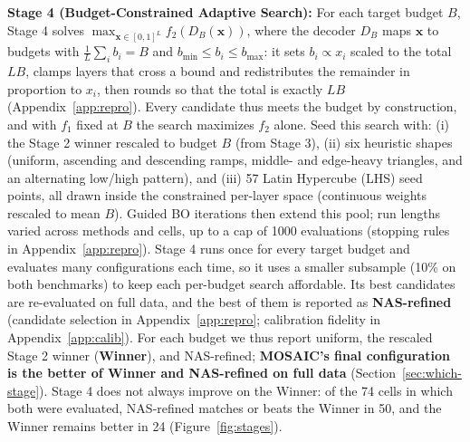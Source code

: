 \documentclass[11pt]{article}
\begin{document}
\begin{table}[htbp]
  \centering
  \scriptsize
  \setlength{\tabcolsep}{2.6pt}
  
  \caption{\textbf{One search, many budgets.} Stage 3: the Stage 2 winner, found once at its natural average budget and rescaled to every target budget with no further search. Stage 4: NAS-refined, the best configuration of the budget-constrained search, available only at budgets where it ran. MOSAIC: its final configuration, the better of Winner and NAS-refined (chosen per budget), at the same budgets as Stage 4. Wins: budgets where the configuration beats uniform on full data; $\Delta$: mean gain over uniform.}
  \label{tab:transfer}
\end{table}

\textbf{Stage 4 (Budget-Constrained Adaptive Search):} For each target budget $B$, Stage 4 solves $\max_{\mathbf{x} \in [0,1]^L} f_2(D_B(\mathbf{x}))$, where the decoder $D_B$ maps $\mathbf{x}$ to budgets with $\frac{1}{L}\sum_i b_i = B$ and $b_{\min} \le b_i \le b_{\max}$: it sets $b_i \propto x_i$ scaled to the total $LB$, clamps layers that cross a bound and redistributes the remainder in proportion to $x_i$, then rounds so that the total is exactly $LB$ (Appendix~\ref{app:repro}). Every candidate thus meets the budget by construction, and with $f_1$ fixed at $B$ the search maximizes $f_2$ alone. Seed this search with: (i) the Stage 2 winner rescaled to budget $B$ (from Stage 3), (ii) six heuristic shapes (uniform, ascending and descending ramps, middle- and edge-heavy triangles, and an alternating low/high pattern), and (iii) 57 Latin Hypercube (LHS) seed points, all drawn inside the constrained per-layer space (continuous weights rescaled to mean $B$). Guided BO iterations then extend this pool; run lengths varied across methods and cells, up to a cap of 1000 evaluations (stopping rules in Appendix~\ref{app:repro}). Stage 4 runs once for every target budget and evaluates many configurations each time, so it uses a smaller subsample (10\% on both benchmarks) to keep each per-budget search affordable. Its best candidates are re-evaluated on full data, and the best of them is reported as \textbf{NAS-refined} (candidate selection in Appendix~\ref{app:repro}; calibration fidelity in Appendix~\ref{app:calib}). For each budget we thus report uniform, the rescaled Stage 2 winner (\textbf{Winner}), and NAS-refined; \textbf{MOSAIC's final configuration is the better of Winner and NAS-refined on full data} (Section~\ref{sec:which-stage}). Stage 4 does not always improve on the Winner: of the 74 cells in which both were evaluated, NAS-refined matches or beats the Winner in 50, and the Winner remains better in 24 (Figure~\ref{fig:stages}).
\end{document}
